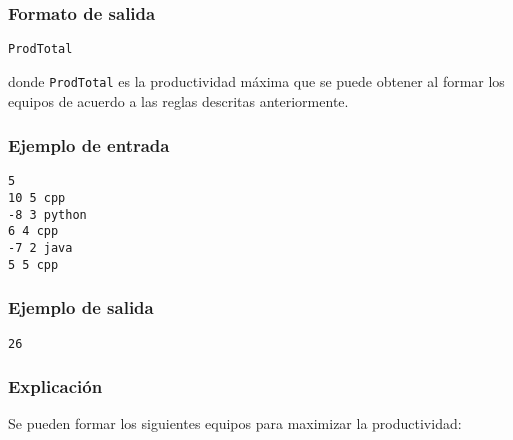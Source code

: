\subsubsection*{Formato de salida}

\begin{verbatim}
ProdTotal
\end{verbatim}

donde \texttt{ProdTotal} es la productividad máxima que se puede obtener al formar los equipos de acuerdo a las reglas descritas anteriormente.

\subsubsection*{Ejemplo de entrada}

\begin{verbatim}
5
10 5 cpp
-8 3 python
6 4 cpp
-7 2 java
5 5 cpp
\end{verbatim}

\subsubsection*{Ejemplo de salida}

\begin{verbatim}
26
\end{verbatim}

\subsubsection*{Explicación}


Se pueden formar los siguientes equipos para maximizar la productividad:

